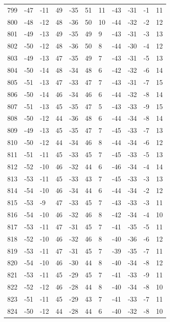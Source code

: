 \begin{table}[H]
\begin{tabular}{lllllllllll}
799 & -47 & -11 & 49 & -35 & 51 & 11 & -43 & -31 & -1 & 11 \\
800 & -48 & -12 & 48 & -36 & 50 & 10 & -44 & -32 & -2 & 12 \\
801 & -49 & -13 & 49 & -35 & 49 & 9 & -43 & -31 & -3 & 13 \\
802 & -50 & -12 & 48 & -36 & 50 & 8 & -44 & -30 & -4 & 12 \\
803 & -49 & -13 & 47 & -35 & 49 & 7 & -43 & -31 & -5 & 13 \\
804 & -50 & -14 & 48 & -34 & 48 & 6 & -42 & -32 & -6 & 14 \\
805 & -51 & -13 & 47 & -33 & 47 & 7 & -43 & -31 & -7 & 15 \\
806 & -50 & -14 & 46 & -34 & 46 & 6 & -44 & -32 & -8 & 14 \\
807 & -51 & -13 & 45 & -35 & 47 & 5 & -43 & -33 & -9 & 15 \\
808 & -50 & -12 & 44 & -36 & 48 & 6 & -44 & -34 & -8 & 14 \\
809 & -49 & -13 & 45 & -35 & 47 & 7 & -45 & -33 & -7 & 13 \\
810 & -50 & -12 & 44 & -34 & 46 & 8 & -44 & -34 & -6 & 12 \\
811 & -51 & -11 & 45 & -33 & 45 & 7 & -45 & -33 & -5 & 13 \\
812 & -52 & -10 & 46 & -32 & 44 & 6 & -46 & -34 & -4 & 14 \\
813 & -53 & -11 & 45 & -33 & 43 & 7 & -45 & -33 & -3 & 13 \\
814 & -54 & -10 & 46 & -34 & 44 & 6 & -44 & -34 & -2 & 12 \\
815 & -53 & -9 & 47 & -33 & 45 & 7 & -43 & -33 & -3 & 11 \\
816 & -54 & -10 & 46 & -32 & 46 & 8 & -42 & -34 & -4 & 10 \\
817 & -53 & -11 & 47 & -31 & 45 & 7 & -41 & -35 & -5 & 11 \\
818 & -52 & -10 & 46 & -32 & 46 & 8 & -40 & -36 & -6 & 12 \\
819 & -53 & -11 & 47 & -31 & 45 & 7 & -39 & -35 & -7 & 11 \\
820 & -54 & -10 & 46 & -30 & 44 & 8 & -40 & -34 & -8 & 12 \\
821 & -53 & -11 & 45 & -29 & 45 & 7 & -41 & -33 & -9 & 11 \\
822 & -52 & -12 & 46 & -28 & 44 & 8 & -40 & -34 & -8 & 10 \\
823 & -51 & -11 & 45 & -29 & 43 & 7 & -41 & -33 & -7 & 11 \\
824 & -50 & -12 & 44 & -28 & 44 & 6 & -40 & -32 & -8 & 10 \\

\end{tabular}
\end{table}
